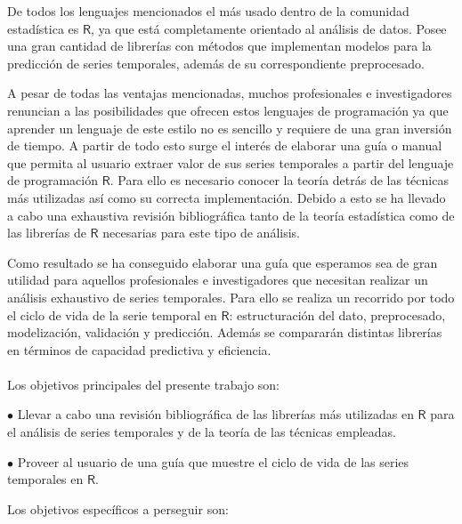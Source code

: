 De todos los lenguajes mencionados el más usado dentro de la comunidad estadística es $\textsf{R}$, ya que está completamente orientado al análisis de datos. Posee una gran cantidad de librerías con métodos que implementan modelos para la predicción de series temporales, además de su correspondiente preprocesado.

A pesar de todas las ventajas mencionadas, muchos profesionales e investigadores renuncian a las posibilidades que ofrecen estos lenguajes de programación ya que aprender un lenguaje de este estilo no es sencillo y requiere de una gran inversión de tiempo. A partir de todo esto surge el interés de elaborar una guía o manual que permita al usuario extraer valor de sus series temporales a partir del lenguaje de programación $\textsf{R}$. Para ello es necesario conocer la teoría detrás de las técnicas más utilizadas así como su correcta implementación. Debido a esto se ha llevado a cabo una exhaustiva revisión bibliográfica tanto de la teoría estadística como de las librerías de $\textsf{R}$ necesarias para este tipo de análisis.
	
Como resultado se ha conseguido elaborar una guía que esperamos sea de gran utilidad para aquellos profesionales e investigadores que necesitan realizar un análisis exhaustivo de series temporales. Para ello se realiza un recorrido por todo el ciclo de vida de la serie temporal en $\textsf{R}$: estructuración del dato, preprocesado, modelización, validación y predicción. Además se compararán distintas librerías en términos de capacidad predictiva y eficiencia.\\
\\
Los objetivos principales del presente trabajo son:

\begin{itemize*}
  \item[$\bullet$]Llevar a cabo una revisión bibliográfica de las librerías más utilizadas en $\textsf{R}$ para el análisis de series temporales y de la teoría de las técnicas empleadas.
  \item[$\bullet$]Proveer al usuario de una guía que muestre el ciclo de vida de las series temporales en $\textsf{R}$.
\end{itemize*}

Los objetivos específicos a perseguir son:

